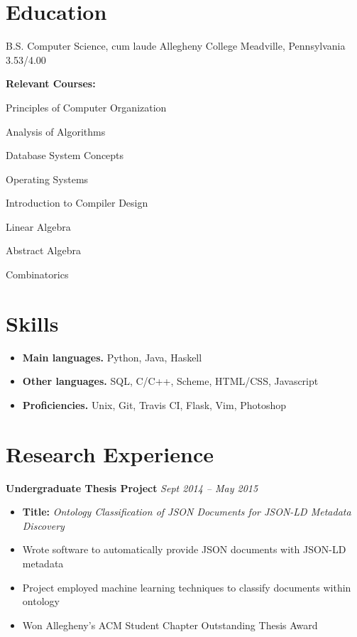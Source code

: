 \documentclass[11pt,letter,sans]{moderncv}
\begin{document}
\makecvtitle
\vspace*{-1cm}

\section{ Education }

    {B.S. Computer Science, cum laude}%
    {Allegheny College}%
    {Meadville, Pennsylvania}%
    {3.53/4.00}%
    {}

    \textbf{Relevant Courses:}
    \begin{itemize}
        \begin{multicols}{2}
            \item Principles of Computer Organization
            \item Analysis of Algorithms
            \item Database System Concepts
            \item Operating Systems
            \columnbreak
            \item Introduction to Compiler Design
            \item Linear Algebra
            \item Abstract Algebra
            \item Combinatorics
        \end{multicols}
    \end{itemize}

\section{ Skills }

    \begin{itemize}
        \item { \bf Main languages. } Python, Java, Haskell
        \item { \bf Other languages. } SQL, C/C++, Scheme, HTML/CSS, Javascript
        \item { \bf Proficiencies. } Unix, Git, Travis CI, Flask, Vim, Photoshop
    \end{itemize}

\section{Research Experience }

    \textbf{Undergraduate Thesis Project}%
    \hfill
    \textit{Sept 2014 -- May 2015}%
    \begin{itemize}
        \item {\bf Title:} {\em Ontology Classification of JSON Documents
            for JSON-LD Metadata Discovery}
        \item Wrote software to automatically provide JSON documents with
            JSON-LD metadata
        \item Project employed machine learning techniques to classify
            documents within ontology
        \item Won Allegheny's ACM Student Chapter Outstanding Thesis Award
    \end{itemize}
    \vspace{2mm}
\end{document}
